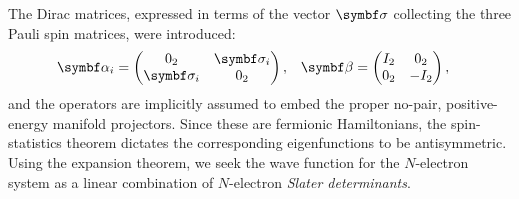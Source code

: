 The Dirac matrices, expressed in terms of the vector $\mat{\sigma}$
collecting the three Pauli spin matrices, were introduced:
\begin{alignat}{2}
  \mat{\alpha}_i =
  \begin{pmatrix}
    0_2 & \mat{\sigma}_i \\
    \mat{\sigma}_i & 0_2
  \end{pmatrix},
  \quad&
  \mat{\beta} =
  \begin{pmatrix}
    I_2 & 0_2 \\
    0_2 & -I_2
  \end{pmatrix},
\end{alignat}
and the operators are implicitly assumed to embed the proper no-pair,
positive-energy manifold projectors.\autocite{Sucher1980-vf}
Since these are fermionic Hamiltonians, the spin-statistics theorem
dictates the corresponding eigenfunctions to be
antisymmetric.
Using the expansion theorem,\autocite{Gross1991-hi} we seek the wave
function for the $N$-electron system as a linear combination of
$N$-electron \emph{Slater determinants}.

